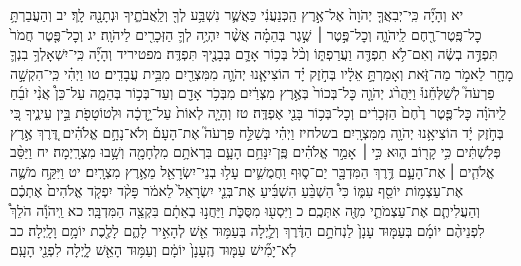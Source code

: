 \documentclass[twoside, openany, parskip=half, 11pt]{book}
\begin{document}
יא וְהָיָ֞ה כִּֽי־יְבִאֲךָ֤ יְהֹוָה֙ אֶל־אֶ֣רֶץ הַֽכְּנַעֲנִ֔י כַּאֲשֶׁ֛ר נִשְׁבַּ֥ע לְךָ֖ וְלַֽאֲבֹתֶ֑יךָ וּנְתָנָ֖הּ לָֽךְ׃ יב וְהַעֲבַרְתָּ֥ כׇל־פֶּֽטֶר־רֶ֖חֶם לַֽיהֹוָ֑ה וְכׇל־פֶּ֣טֶר ׀ שֶׁ֣גֶר בְּהֵמָ֗ה אֲשֶׁ֨ר יִהְיֶ֥ה לְךָ֛ הַזְּכָרִ֖ים לַיהֹוָֽה׃ יג וְכׇל־פֶּ֤טֶר חֲמֹר֙ תִּפְדֶּ֣ה בְשֶׂ֔ה וְאִם־לֹ֥א תִפְדֶּ֖ה וַעֲרַפְתּ֑וֹ וְכֹ֨ל בְּכ֥וֹר אָדָ֛ם בְּבָנֶ֖יךָ תִּפְדֶּֽה׃ מפטיריד וְהָיָ֞ה כִּֽי־יִשְׁאָלְךָ֥ בִנְךָ֛ מָחָ֖ר לֵאמֹ֣ר מַה־זֹּ֑את וְאָמַרְתָּ֣ אֵלָ֔יו בְּחֹ֣זֶק יָ֗ד הוֹצִיאָ֧נוּ יְהֹוָ֛ה מִמִּצְרַ֖יִם מִבֵּ֥ית עֲבָדִֽים׃ טו וַיְהִ֗י כִּֽי־הִקְשָׁ֣ה פַרְעֹה֮ לְשַׁלְּחֵ֒נוּ֒ וַיַּהֲרֹ֨ג יְהֹוָ֤ה כׇּל־בְּכוֹר֙ בְּאֶ֣רֶץ מִצְרַ֔יִם מִבְּכֹ֥ר אָדָ֖ם וְעַד־בְּכ֣וֹר בְּהֵמָ֑ה עַל־כֵּן֩ אֲנִ֨י זֹבֵ֜חַ לַֽיהֹוָ֗ה כׇּל־פֶּ֤טֶר רֶ֙חֶם֙ הַזְּכָרִ֔ים וְכׇל־בְּכ֥וֹר בָּנַ֖י אֶפְדֶּֽה׃ טז וְהָיָ֤ה לְאוֹת֙ עַל־יָ֣דְכָ֔ה וּלְטוֹטָפֹ֖ת בֵּ֣ין עֵינֶ֑יךָ כִּ֚י בְּחֹ֣זֶק יָ֔ד הוֹצִיאָ֥נוּ יְהֹוָ֖ה מִמִּצְרָֽיִם׃
בשלחיז וַיְהִ֗י בְּשַׁלַּ֣ח פַּרְעֹה֮ אֶת־הָעָם֒ וְלֹא־נָחָ֣ם אֱלֹהִ֗ים דֶּ֚רֶךְ אֶ֣רֶץ פְּלִשְׁתִּ֔ים כִּ֥י קָר֖וֹב ה֑וּא כִּ֣י ׀ אָמַ֣ר אֱלֹהִ֗ים פֶּֽן־יִנָּחֵ֥ם הָעָ֛ם בִּרְאֹתָ֥ם מִלְחָמָ֖ה וְשָׁ֥בוּ מִצְרָֽיְמָה׃ יח וַיַּסֵּ֨ב אֱלֹהִ֧ים ׀ אֶת־הָעָ֛ם דֶּ֥רֶךְ הַמִּדְבָּ֖ר יַם־ס֑וּף וַחֲמֻשִׁ֛ים עָל֥וּ בְנֵי־יִשְׂרָאֵ֖ל מֵאֶ֥רֶץ מִצְרָֽיִם׃ יט וַיִּקַּ֥ח מֹשֶׁ֛ה אֶת־עַצְמ֥וֹת יוֹסֵ֖ף עִמּ֑וֹ כִּי֩ הַשְׁבֵּ֨עַ הִשְׁבִּ֜יעַ אֶת־בְּנֵ֤י יִשְׂרָאֵל֙ לֵאמֹ֔ר פָּקֹ֨ד יִפְקֹ֤ד אֱלֹהִים֙ אֶתְכֶ֔ם וְהַעֲלִיתֶ֧ם אֶת־עַצְמֹתַ֛י מִזֶּ֖ה אִתְּכֶֽם׃ כ וַיִּסְע֖וּ מִסֻּכֹּ֑ת וַיַּחֲנ֣וּ בְאֵתָ֔ם בִּקְצֵ֖ה הַמִּדְבָּֽר׃ כא וַֽיהֹוָ֡ה הֹלֵךְ֩ לִפְנֵיהֶ֨ם יוֹמָ֜ם בְּעַמּ֤וּד עָנָן֙ לַנְחֹתָ֣ם הַדֶּ֔רֶךְ וְלַ֛יְלָה בְּעַמּ֥וּד אֵ֖שׁ לְהָאִ֣יר לָהֶ֑ם לָלֶ֖כֶת יוֹמָ֥ם וָלָֽיְלָה׃ כב לֹֽא־יָמִ֞ישׁ עַמּ֤וּד הֶֽעָנָן֙ יוֹמָ֔ם וְעַמּ֥וּד הָאֵ֖שׁ לָ֑יְלָה לִפְנֵ֖י הָעָֽם׃
\end{document}
